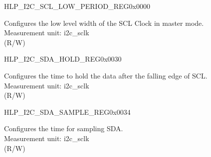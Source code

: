 \begin{register}{H}{LP\_I2C\_SCL\_LOW\_PERIOD\_REG}{0x0000}\label{regdesc:LPI2CSCLLOWPERIODREG}
%
%
\regnewline%
\begin{regdesc}\begin{reglist}
\label{fielddesc:LPI2CSCLLOWPERIOD}\item [LP\_I2C\_SCL\_LOW\_PERIOD] Configures the low level width of the SCL Clock in master mode. \\
Measurement unit: i2c\_sclk \\ (R/W)
\end{reglist}\end{regdesc}
\end{register}


\begin{register}{H}{LP\_I2C\_SDA\_HOLD\_REG}{0x0030}\label{regdesc:LPI2CSDAHOLDREG}
%
%
\regnewline%
\begin{regdesc}\begin{reglist}
\label{fielddesc:LPI2CSDAHOLDTIME}\item [LP\_I2C\_SDA\_HOLD\_TIME] Configures the time to hold the data after the falling edge of SCL.\\
Measurement unit: i2c\_sclk \\ (R/W)
\end{reglist}\end{regdesc}
\end{register}


\begin{register}{H}{LP\_I2C\_SDA\_SAMPLE\_REG}{0x0034}\label{regdesc:LPI2CSDASAMPLEREG}
%
%
\regnewline%
\begin{regdesc}\begin{reglist}
\label{fielddesc:LPI2CSDASAMPLETIME}\item [LP\_I2C\_SDA\_SAMPLE\_TIME] Configures the time for sampling SDA.\\
Measurement unit: i2c\_sclk \\ (R/W)
\end{reglist}\end{regdesc}
\end{register}


